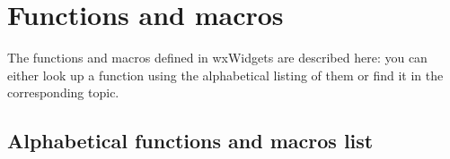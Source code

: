 
\chapter{Functions and macros}\label{functions}
%
\setfooter{\thepage}{}{}{}{}{\thepage}

The functions and macros defined in wxWidgets are described here: you can
either look up a function using the alphabetical listing of them or find it in
the corresponding topic.

\section{Alphabetical functions and macros list}\label{functionsalphabetically}

